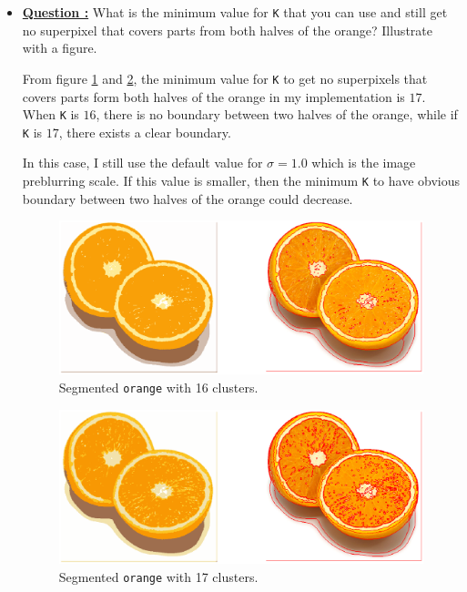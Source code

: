 \documentclass[11pt,a4paper]{article}
\begin{document}
\begin{itemize}
	\item\addtocounter{Counter}{1}\underline{\textbf{Question :}} What is the minimum value for \texttt{K} that you can use and still get no superpixel that covers parts from both halves of the orange? Illustrate with a figure.
		\par From figure \ref{fig:Kmeans_Orange_K_16_L_X} and \ref{fig:Kmeans_Orange_K_17_L_X}, the minimum value for \texttt{K} to get no superpixels that covers parts form both halves of the orange in my implementation is $17$. When \texttt{K} is $16$, there is no boundary between two halves of the orange, while if \texttt{K} is $17$, there exists a clear boundary.\
		\par In this case, I still use the default value for $\sigma=1.0$ which is the image preblurring scale. If this value is smaller, then the minimum \texttt{K} to have obvious boundary between two halves of the orange could decrease.
		\begin{figure}[!ht]
			\centering
			\includegraphics[width=\columnwidth]{Kmeans_Orange_K_16_L_X.eps}
			\caption{Segmented \texttt{orange} with 16 clusters.}
			\label{fig:Kmeans_Orange_K_16_L_X}
		\end{figure}
		
		\begin{figure}[!ht]
			\centering
			\includegraphics[width=\columnwidth]{Kmeans_Orange_K_17_L_X.eps}
			\caption{Segmented \texttt{orange} with 17 clusters.}
			\label{fig:Kmeans_Orange_K_17_L_X}
		\end{figure}


\end{itemize}
\end{document}
